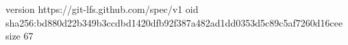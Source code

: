 version https://git-lfs.github.com/spec/v1
oid sha256:bd880d22b349b3ccdbd1420dfb92f387a482ad1dd0353d5c89c5af7260d16cee
size 67
